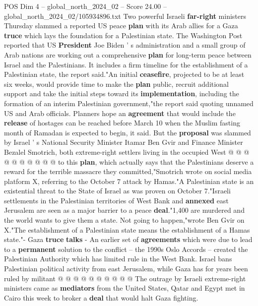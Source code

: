 \begin{textsample}{POS Dim 4 – global\_north\_2024\_02 – Score 24.00 – global\_north\_2024\_02/105934896.txt}  \label{ex:f4_pos_176}
Two powerful Israeli \textbf{far-right} ministers Thursday slammed a reported US peace \textbf{plan} with its Arab allies for a Gaza \textbf{truce} which lays the foundation for a Palestinian state.
The Washington Post reported that US \textbf{President} Joe Biden ' s administration and a small group of Arab nations are working out a comprehensive \textbf{plan} for long-term peace between Israel and the Palestinians.
It includes a firm timeline for the establishment of a Palestinian state, the report said."An initial \textbf{ceasefire}, projected to be at least six weeks, would provide time to make the \textbf{plan} public, recruit additional support and take the initial steps toward its \textbf{implementation}, including the formation of an interim Palestinian government,"the report said quoting unnamed US and Arab officials.
Planners hope an \textbf{agreement} that would include the \textbf{release} of hostages can be reached before March 10 when the Muslim fasting month of Ramadan is expected to begin, it said.
But the \textbf{proposal} was slammed by Israel ' s National Security Minister Itamar Ben Gvir and Finance Minister Bezalel Smotrich, both extreme-right settlers living in the occupied West @ @ @ @ @ @ @ @ @ @ to this \textbf{plan}, which actually says that the Palestinians deserve a reward for the terrible massacre they committed,"Smotrich wrote on social media platform X, referring to the October 7 attack by Hamas."A Palestinian state is an existential threat to the State of Israel as was proven on October 7."Israeli settlements in the Palestinian territories of West Bank and \textbf{annexed} east Jerusalem are seen as a major barrier to a peace \textbf{deal}."1,400 are murdered and the world wants to give them a state.
Not going to happen,"wrote Ben Gvir on X."The establishment of a Palestinian state means the establishment of a Hamas state."- Gaza \textbf{truce} \textbf{talks} - An earlier set of \textbf{agreements} which were due to lead to a \textbf{permanent} solution to the conflict -- the 1990s Oslo Accords -- created the Palestinian Authority which has limited rule in the West Bank.
Israel bans Palestinian political activity from east Jerusalem, while Gaza has for years been ruled by militant @ @ @ @ @ @ @ @ @ @ The outrage by Israeli extreme-right ministers came as \textbf{mediators} from the United States, Qatar and Egypt met in Cairo this week to broker a \textbf{deal} that would halt Gaza fighting.

\end{textsample}
